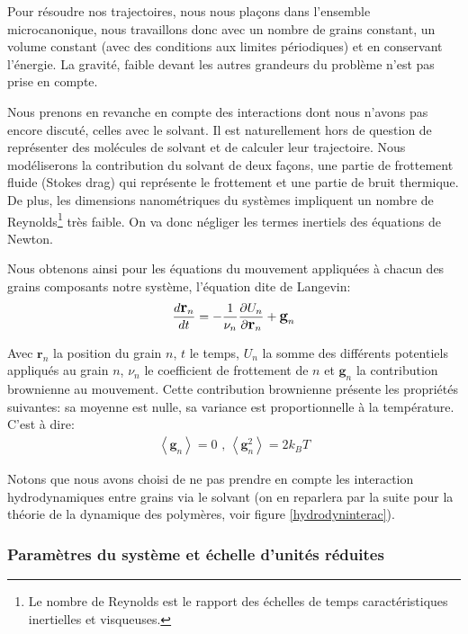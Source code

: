 Pour résoudre nos trajectoires, nous nous plaçons dans l'ensemble microcanonique, nous travaillons donc avec un nombre de grains constant, un volume constant (avec des conditions aux limites périodiques) et en conservant l'énergie. La gravité, faible devant les autres grandeurs du problème n'est pas prise en compte.


Nous prenons en revanche en compte des interactions dont nous n'avons pas encore discuté, celles avec le solvant. Il est naturellement hors de question de représenter des molécules de solvant et de calculer leur trajectoire. Nous modéliserons la contribution du solvant de deux façons, une partie de frottement fluide (Stokes drag) qui représente le frottement et une partie de bruit thermique. De plus, les dimensions nanométriques du systèmes impliquent un nombre de Reynolds\footnote{Le nombre de Reynolds est le rapport des échelles de temps caractéristiques inertielles et visqueuses.} très faible. On va donc négliger les termes inertiels des équations de Newton.

Nous obtenons ainsi pour les équations du mouvement appliquées à chacun des grains composants notre système, l'équation dite de Langevin:
\begin{eqnarray}
\large{
\frac{d \textbf{r}_n}{dt} = - \frac{1}{\nu_n}\frac{\partial U_{n}}{\partial \textbf{r}_n}   + \textbf{g}_n}
\label{langevin}
\end{eqnarray}



Avec $\textbf{r}_n$ la position du grain $n$, $t$ le temps, $U_{n}$ la somme des différents potentiels appliqués au grain $n$, $\nu_n$ le coefficient de frottement de $n$ et $\textbf{g}_n$ la contribution brownienne au mouvement. Cette contribution brownienne présente les propriétés suivantes: sa moyenne est nulle, sa variance est proportionnelle à la température. C'est à dire:
\begin{eqnarray}
\left<\textbf{g}_n\right>\text{}=\text{} 0\text{ , } \left<\textbf{g}_n^2\right>\text{}=\text{} 2 k_B T
\end{eqnarray}

 Notons que nous avons choisi de ne pas prendre en compte les interaction hydrodynamiques entre grains via le solvant (on en reparlera par la suite pour la théorie de la dynamique des polymères, voir figure \ref{hydrodyninterac}).\\


\subsubsection{Paramètres du système et échelle d'unités réduites}

